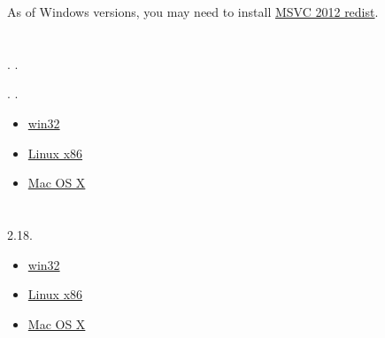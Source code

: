 {As of Windows versions, you may need to install} 
\href{http://www.microsoft.com/en-us/download/details.aspx?id=30679}{MSVC 2012 redist}.

\section{}

.
.

. 
.

\begin{itemize}
\item \href{http://yurichev.com/RE-exercises/2/18/password2.exe}{win32}
\item \href{http://yurichev.com/RE-exercises/2/18/password2_Linux_x86.tar}{Linux x86}
\item \href{http://yurichev.com/RE-exercises/2/18/password2_MacOSX64.tar}{Mac OS X}
\end{itemize}

\section{}

 2.18.

\begin{itemize}
\item \href{http://yurichev.com/RE-exercises/2/19/password3.exe}{win32}
\item \href{http://yurichev.com/RE-exercises/2/19/password3_Linux_x86.tar}{Linux x86}
\item \href{http://yurichev.com/RE-exercises/2/19/password3_MacOSX64.tar}{Mac OS X}
\end{itemize}

